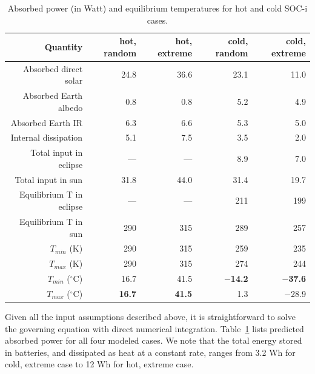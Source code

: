 \documentclass[]{aastex62}
\begin{document}
\begin{table}[t]
	\centering
	\caption{Absorbed power (in Watt) and equilibrium temperatures for hot and cold SOC-i cases. }
	\label{tab:powertemp}
	\begin{tabular}{r|r|r|r|r} %
		\hline
  	                    Quantity          & hot, random   &  hot, extreme &   cold, random  & cold, extreme   \\
		\hline
           Absorbed direct solar         &  24.8        &  36.6     &  23.1         &  11.0      \\
           Absorbed Earth albedo       &    0.8        &    0.8   &     5.2           &  4.9      \\    
               Absorbed Earth IR           &    6.3        &    6.6     &     5.3        &  5.0     \\
             Internal dissipation           &    5.1        &   7.5     &     3.5         &  2.0     \\
		\hline 
             Total input in eclipse       &     ---      &   ---   &     8.9       &    7.0  \\
              Total input in sun            &    31.8      &   44.0  &   31.4        &  19.7  \\
		\hline
              Equilibrium T in eclipse  &     ---     &    ---   &    211       &   199 \\
              Equilibrium T in sun       &      290      &   315   &    289        &  257  \\
 		\hline
                    $T_{min}$  (K)               &      290      &   315   &   259       &  235  \\
                   $T_{max}$  (K)               &      290      &   315   &   274        &  244  \\
		\hline
                    $T_{min}$  ($^\circ$C)   &       16.7         &  41.5             &  {\bf   $-$14.2  }  &  {\bf  $-$37.6}  \\
                   $T_{max}$  ($^\circ$C)    &  {\bf  16.7  }  &    {\bf  41.5}  &        1.3      &  $-$28.9   \\
		\hline
	\end{tabular} 
\end{table}

 


\vskip 0.1in 


Given all the input assumptions described above, it is straightforward to solve the
governing equation with direct numerical integration. Table~\ref{tab:powertemp} lists predicted 
absorbed power for all four modeled cases.  We note that the total energy stored in batteries, and 
dissipated as heat at a constant rate, ranges from 3.2 Wh for cold, extreme case to 12 Wh for hot, 
extreme case. 
\end{document}
